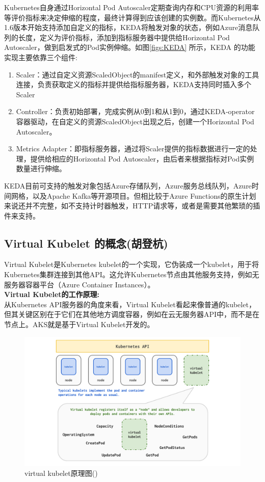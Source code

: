 \documentclass[11pt]{article}
\begin{document}
Kubernetes自身通过Horizo​​ntal Pod Autoscaler定期查询内存和CPU资源的利用率等评价指标来决定伸缩的程度，最终计算得到应该创建的实例数。而Kubernetes从1.6版本开始支持添加自定义的指标，KEDA将触发对象的状态，例如Azure消息队列的长度，定义为评价指标，添加到指标服务器中提供给Horizo​​ntal Pod Autoscaler，做到启发式的Pod实例伸缩。如图\ref{figs:KEDA} 所示，KEDA 的功能实现主要依靠三个组件:
\begin{enumerate}
	\item Scaler：通过自定义资源ScaledObject的manifest定义，和外部触发对象的工具连接，负责获取定义的指标并提供给指标服务器，KEDA支持同时插入多个Scaler
	\item Controller：负责初始部署，完成实例从0到1和从1到0，通过KEDA-operator容器驱动，在自定义的资源ScaledObject出现之后，创建一个Horizo​​ntal Pod Autoscaler。
	\item Metrics Adapter：即指标服务器，通过将Scaler提供的指标数据进行一定的处理，提供给相应的Horizo​​ntal Pod Autoscaler，由后者来根据指标对Pod实例数量进行伸缩。
\end{enumerate}
KEDA目前可支持的触发对象包括Azure存储队列，Azure服务总线队列，Azure时间网格，以及Apache Kafka等开源项目。但相比较于Azure Functions的原生计划来说还并不完整，如不支持计时器触发，HTTP请求等，或者是需要其他繁琐的插件来支持。
\subsection{Virtual Kubelet 的概念(胡登杭)}
Virtual Kubelet是Kubernetes kubelet的一个实现，它伪装成一个kubelet，用于将Kubernetes集群连接到其他API。这允许Kubernetes节点由其他服务支持，例如无服务器容器平台（Azure Container Instances）。\\
\textbf{Virtual Kubelet的工作原理:}\\
从Kubernetes API服务器的角度来看，Virtual Kubelet看起来像普通的kubelet，但其关键区别在于它们在其他地方调度容器，例如在云无服务器API中，而不是在节点上。AKS就是基于Virtual Kubelet开发的。
\begin{figure}[H]
\begin{flushleft}
\includegraphics[width=\textwidth]{figs/vk-diagram.pdf}
\caption{virtual kubelet原理图(\cite{vk})}
\end{flushleft}
\end{figure}
\end{document}

